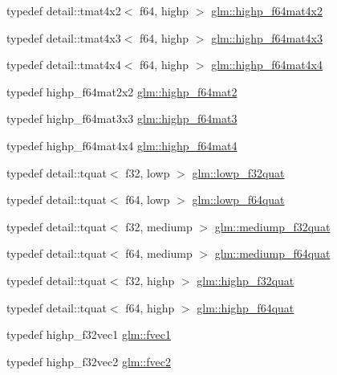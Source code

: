 \begin{DoxyCompactItemize}
\item 
typedef detail\+::tmat4x2$<$ f64, highp $>$ \hyperlink{group__gtc__type__precision_gabe9bc3680e7d83a7b34297da518a8117}{glm\+::highp\+\_\+f64mat4x2}
\item 
typedef detail\+::tmat4x3$<$ f64, highp $>$ \hyperlink{group__gtc__type__precision_ga0264562b4667b8073b7708efc2280691}{glm\+::highp\+\_\+f64mat4x3}
\item 
typedef detail\+::tmat4x4$<$ f64, highp $>$ \hyperlink{group__gtc__type__precision_gaa95b52552df369b75d09155ebb29b1bd}{glm\+::highp\+\_\+f64mat4x4}
\item 
typedef highp\+\_\+f64mat2x2 \hyperlink{group__gtc__type__precision_ga7d9fd446fd43310ba6f63c8f9468acc0}{glm\+::highp\+\_\+f64mat2}
\item 
typedef highp\+\_\+f64mat3x3 \hyperlink{group__gtc__type__precision_ga00c5743b0eba6b437422571f4eda27b8}{glm\+::highp\+\_\+f64mat3}
\item 
typedef highp\+\_\+f64mat4x4 \hyperlink{group__gtc__type__precision_ga1ac5d0564721a22765c68c54a0a4f87a}{glm\+::highp\+\_\+f64mat4}
\item 
typedef detail\+::tquat$<$ f32, lowp $>$ \hyperlink{group__gtc__type__precision_ga83edc5f21bfa41f72f881b29aabbd919}{glm\+::lowp\+\_\+f32quat}
\item 
typedef detail\+::tquat$<$ f64, lowp $>$ \hyperlink{group__gtc__type__precision_ga225e6f95dd6a7049b1a86db23b90cbac}{glm\+::lowp\+\_\+f64quat}
\item 
typedef detail\+::tquat$<$ f32, mediump $>$ \hyperlink{group__gtc__type__precision_gab038e3482ca401bca2b2634c96f44f09}{glm\+::mediump\+\_\+f32quat}
\item 
typedef detail\+::tquat$<$ f64, mediump $>$ \hyperlink{group__gtc__type__precision_ga7cf626acf7f4fc29355c147bfe05163d}{glm\+::mediump\+\_\+f64quat}
\item 
typedef detail\+::tquat$<$ f32, highp $>$ \hyperlink{group__gtc__type__precision_ga26eef27d2efbd759e7e93c40672402e9}{glm\+::highp\+\_\+f32quat}
\item 
typedef detail\+::tquat$<$ f64, highp $>$ \hyperlink{group__gtc__type__precision_ga9372e8b60f401fd94aba637b3ed17cfc}{glm\+::highp\+\_\+f64quat}
\item 
typedef highp\+\_\+f32vec1 \hyperlink{group__gtc__type__precision_gab927d62f22fa57461367011950cec650}{glm\+::fvec1}
\item 
typedef highp\+\_\+f32vec2 \hyperlink{group__gtc__type__precision_gaafd518792a4646c7bb60aabc62a4684c}{glm\+::fvec2}
\item 

\end{DoxyCompactItemize}
